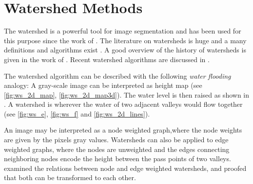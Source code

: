\section{Watershed Methods}\label{sec:rw_watershed_methods}

The watershed is a powerful tool for image segmentation and
has been used for this purpose since the work of
\citet{beucher_1979_workshop}.
The literature on watersheds is huge and 
a many definitions and algorithms exist
\citep{vinent_1991_pami,beuchner_1994_waterfall,najman_1994_sp,
roerdink_2000_finf,bertrand_2005_jmiv,cousty_2009_pami,
meyer_2012_corr,meyer_2012_corr2}.
A good overview  of the history of watersheds 
is given in the work of \citet{meyer_2012_corr}.
Recent watershed algorithms are discussed in \citep{meyer_2012_corr2}.

The watershed algorithm can be described with the following  \emph{water flooding} analogy:
A gray-scale  image can be interpreted as height map (see \cref{fig:ws_2d_map}, \cref{fig:ws_2d_map3d}).
The water level is then raised as shown in .
A watershed is wherever the water of two adjacent valleys would flow together (see \cref{fig:ws_e}, \cref{fig:ws_f} and \cref{fig:ws_2d_lines}).


An image may be interpreted as a node weighted graph,where the node weights
are given by the pixels gray values.
Watersheds can also be applied to edge weighted graphs, where the nodes are unweighted 
and the edges connecting neighboring nodes encode the height between the pass points of two valleys.
\citet{meyer_2012_corr2} examined the relations between node and edge weighted watersheds, 
and proofed that both can be transformed to each other.





